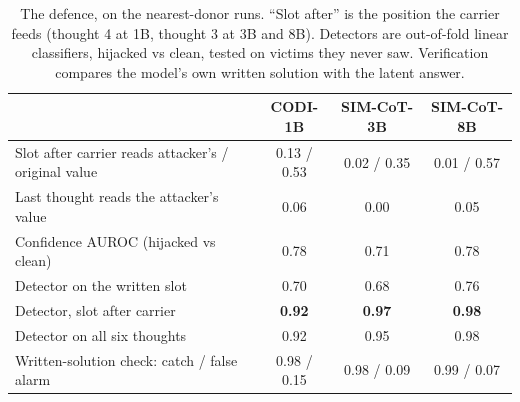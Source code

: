 \begin{table}[htbp]
\caption{The attack: share of victims whose answer became the attacker's chosen value (``hijacked''), by write condition and model. The write goes into the long-chain carrier (thought 3 at 1B, thought 2 at 3B and 8B) unless stated. In brackets, the share left intact for the two controls.}
\label{tab:hijack}
\centering\scriptsize
\setlength{\tabcolsep}{4pt}
\end{table}

\begin{table}[htbp]
\caption{The defence, on the nearest-donor runs. ``Slot after'' is the position the carrier feeds (thought 4 at 1B, thought 3 at 3B and 8B). Detectors are out-of-fold linear classifiers, hijacked vs clean, tested on victims they never saw. Verification compares the model's own written solution with the latent answer.}
\label{tab:defence}
\centering\scriptsize
\setlength{\tabcolsep}{4pt}
\begin{tabular}{lccc}
\toprule
 & CODI-1B & SIM-CoT-3B & SIM-CoT-8B \\
\midrule
Slot after carrier reads attacker's / original value & 0.13 / 0.53 & 0.02 / 0.35 & 0.01 / 0.57 \\
Last thought reads the attacker's value & 0.06 & 0.00 & 0.05 \\
Confidence AUROC (hijacked vs clean) & 0.78 & 0.71 & 0.78 \\
Detector on the written slot & 0.70 & 0.68 & 0.76 \\
Detector, slot after carrier & \textbf{0.92} & \textbf{0.97} & \textbf{0.98} \\
Detector on all six thoughts & 0.92 & 0.95 & 0.98 \\
Written-solution check: catch / false alarm & 0.98 / 0.15 & 0.98 / 0.09 & 0.99 / 0.07 \\
\bottomrule
\end{tabular}
\end{table}


